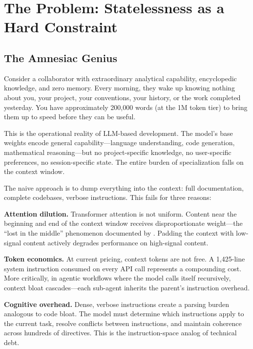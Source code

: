 \documentclass[11pt, a4paper]{article}
\begin{document}
\section{The Problem: Statelessness as a Hard Constraint}
\label{sec:problem}

\subsection{The Amnesiac Genius}

Consider a collaborator with extraordinary analytical capability, encyclopedic knowledge, and zero memory. Every morning, they wake up knowing nothing about you, your project, your conventions, your history, or the work completed yesterday. You have approximately 200,000 words (at the 1M token tier) to bring them up to speed before they can be useful.

This is the operational reality of LLM-based development. The model's base weights encode general capability---language understanding, code generation, mathematical reasoning---but no project-specific knowledge, no user-specific preferences, no session-specific state. The entire burden of specialization falls on the context window.

The naive approach is to dump everything into the context: full documentation, complete codebases, verbose instructions. This fails for three reasons:

\textbf{Attention dilution.} Transformer attention is not uniform. Content near the beginning and end of the context window receives disproportionate weight---the ``lost in the middle'' phenomenon documented by \citet{liu2023lost}. Padding the context with low-signal content actively degrades performance on high-signal content.

\textbf{Token economics.} At current pricing, context tokens are not free. A 1,425-line system instruction consumed on every API call represents a compounding cost. More critically, in agentic workflows where the model calls itself recursively, context bloat cascades---each sub-agent inherits the parent's instruction overhead.

\textbf{Cognitive overhead.} Dense, verbose instructions create a parsing burden analogous to code bloat. The model must determine which instructions apply to the current task, resolve conflicts between instructions, and maintain coherence across hundreds of directives. This is the instruction-space analog of technical debt.
\end{document}
